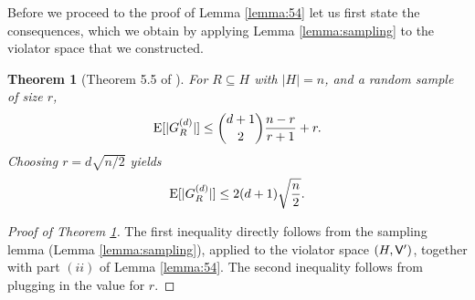 \documentclass[12pt]{article}
\def\Exp{\qopname\relax m{E}}
\def\Violators{{\sf V}}
\newtheorem{theorem2}{Theorem}[section]
\newenvironment{theorem}{\begin{theorem2}}{\end{theorem2}}
\theoremstyle{remark}
\begin{document}
    Before we proceed to the proof of Lemma \ref{lemma:54} let us first state the consequences, which
    we obtain by applying Lemma \ref{lemma:sampling} to the violator space that we constructed.
    
    \begin{theorem}[Theorem 5.5 of \cite{GWSampl01}]
    \label{theorem:sizeofG}
     For $R\subseteq H$ with $|H| = n$,  and a random sample of size $r$,
     \[
     	\Exp[|G_{R}^{(d)}|] \leq {{d+1}\choose{2}} \frac{n  - r}{r+1} + r.
     \]
     Choosing $r=d \sqrt{n/2}$ yields
     \[
     	\Exp[|G_{R}^{(d)}|] \leq 2(d+1)\sqrt{\frac{n}{2}}.
     \]
    \end{theorem}
    \begin{proof}[Proof of Theorem \ref{theorem:sizeofG}]
    The first inequality directly follows from the sampling lemma (Lemma \ref{lemma:sampling}),  
applied
    to the violator space $(H, \Violators')$, together with part $(ii)$ of Lemma \ref{lemma:54}. The 
second
    inequality follows from plugging in the value for $r$.
    \end{proof}
    
\end{document}
